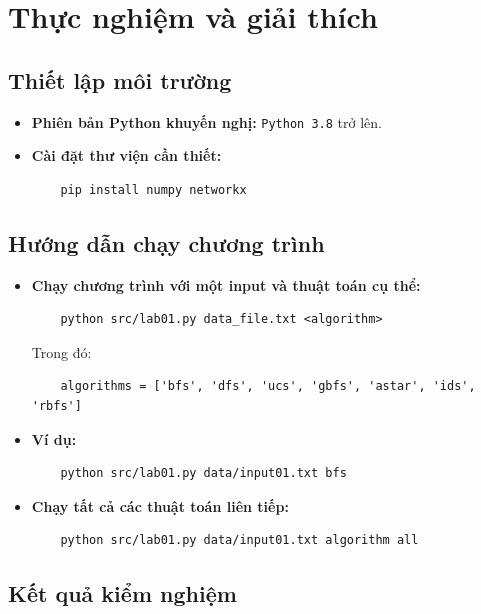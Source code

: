 \section{Thực nghiệm và giải thích}

\subsection{Thiết lập môi trường}

\begin{itemize}
    \item \textbf{Phiên bản Python khuyến nghị:} \texttt{Python 3.8} trở lên.
    \item \textbf{Cài đặt thư viện cần thiết:}
    \begin{verbatim}
    pip install numpy networkx
    \end{verbatim}
\end{itemize}

\subsection{Hướng dẫn chạy chương trình}

\begin{itemize}
    \item \textbf{Chạy chương trình với một input và thuật toán cụ thể:}
    \begin{verbatim}
    python src/lab01.py data_file.txt <algorithm>
    \end{verbatim}
    Trong đó:
    \begin{verbatim}
    algorithms = ['bfs', 'dfs', 'ucs', 'gbfs', 'astar', 'ids', 'rbfs']
    \end{verbatim}

    \item \textbf{Ví dụ:}
    \begin{verbatim}
    python src/lab01.py data/input01.txt bfs
    \end{verbatim}

    \item \textbf{Chạy tất cả các thuật toán liên tiếp:}
    \begin{verbatim}
    python src/lab01.py data/input01.txt algorithm all
    \end{verbatim}
\end{itemize}


\subsection{Kết quả kiểm nghiệm}

